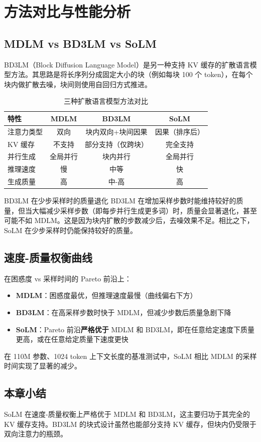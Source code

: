 \section{方法对比与性能分析}

\subsection{MDLM vs BD3LM vs SoLM}

BD3LM（Block Diffusion Language Model）是另一种支持 KV 缓存的扩散语言模型方法。其思路是将长序列分成固定大小的块（例如每块 100 个 token），在每个块内做扩散去噪，块间则使用自回归方式推进。

\begin{table}[H]
\centering
\caption{三种扩散语言模型方法对比}
\begin{tabular}{@{}lccc@{}}
\toprule
\textbf{特性} & \textbf{MDLM} & \textbf{BD3LM} & \textbf{SoLM} \\
\midrule
注意力类型 & 双向 & 块内双向+块间因果 & 因果（排序后） \\
KV 缓存 & 不支持 & 部分支持（仅跨块） & 完全支持 \\
并行生成 & 全局并行 & 块内并行 & 全局并行 \\
推理速度 & 慢 & 中等 & 快 \\
生成质量 & 高 & 中-高 & 高 \\
\bottomrule
\end{tabular}
\end{table}

\begin{warningbox}{BD3LM 在少步采样时的质量退化}
BD3LM 在增加采样步数时能维持较好的质量，但当大幅减少采样步数（即每步并行生成更多词）时，质量会显著退化，甚至可能不如 MDLM。这是因为块内扩散的步数减少后，去噪效果不足。相比之下，SoLM 在少步采样时仍能保持较好的质量。
\end{warningbox}

\subsection{速度-质量权衡曲线}

在困惑度 vs 采样时间的 Pareto 前沿上：

\begin{itemize}
    \item \textbf{MDLM}：困惑度最优，但推理速度最慢（曲线偏右下方）
    \item \textbf{BD3LM}：在高采样步数时快于 MDLM，但减少步数后质量急剧下降
    \item \textbf{SoLM}：Pareto 前沿\textbf{严格优于} MDLM 和 BD3LM，即在任意给定速度下质量更高，或在任意给定质量下速度更快
\end{itemize}

在 110M 参数、1024 token 上下文长度的基准测试中，SoLM 相比 MDLM 的采样时间实现了显著的减少。

\subsection{本章小结}

SoLM 在速度-质量权衡上严格优于 MDLM 和 BD3LM，这主要归功于其完全的 KV 缓存支持。BD3LM 的块式设计虽然也能部分支持 KV 缓存，但块内仍受限于双向注意力的瓶颈。

\newpage

